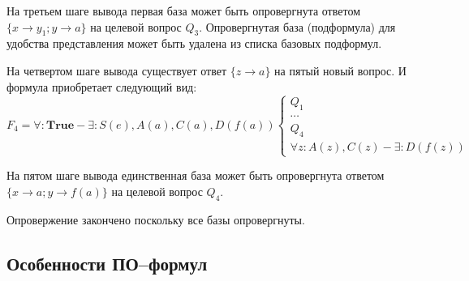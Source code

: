 \begin{example}
На третьем шаге вывода первая база может быть опровергнута ответом $\{x \rightarrow y_1; y \rightarrow a\}$ на целевой вопрос $Q_3$. Опровергнутая база (подформула) для удобства представления может быть удалена из списка базовых подформул.

На четвертом шаге вывода существует ответ $\{z \rightarrow a\}$ на пятый новый вопрос. И формула приобретает следующий вид:
\begin{equation*}\label{ex:f5}
	F_4 = \forall\colon\boldsymbol{True} - \exists\colon S(e),A(a), C(a),D(f(a))
	\left\lbrace
	\begin{array}{l}
		Q_1 \\ \cdots \\ Q_4 \\
		\forall z\colon A(z),C(z) - \exists\colon D(f(z))
	\end{array}\right.
\end{equation*}

На пятом шаге вывода единственная база может быть опровергнута ответом $\{x \rightarrow a; y \rightarrow f(a)\}$ на целевой вопрос $Q_4$.

Опровержение закончено поскольку все базы опровергнуты.

\end{example}


\subsection{Особенности ПО--формул}

